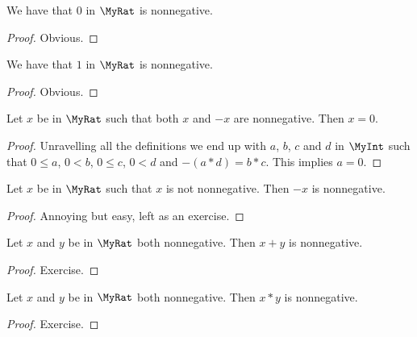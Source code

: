 \begin{lemma}
    \label{MyRat.zero_nonneg}
    \leanok
    We have that $0$ in $\MyRat$ is nonnegative.
\end{lemma}
\begin{proof}
    \leanok
    Obvious.
\end{proof}

\begin{lemma}
    \label{MyRat.one_nonneg}
    \leanok
    We have that $1$ in $\MyRat$ is nonnegative.
\end{lemma}
\begin{proof}
    \leanok
    Obvious.
\end{proof}

\begin{lemma}
    \label{MyRat.nonneg_neg}
    \leanok
    Let $x$ be in $\MyRat$ such that both $x$ and $-x$ are nonnegative. Then $x = 0$.
\end{lemma}
\begin{proof}
    \leanok
    Unravelling all the definitions we end up with $a$, $b$, $c$ and $d$ in $\MyInt$ such that $0 \leq a$, $0 < b$, $0 \leq c$, $0 < d$ and $-(a*d)=b*c$. This implies $a=0$.
\end{proof}

\begin{lemma}
    \label{MyRat.nonneg_neg_of_not_nonneg}
    \leanok
    Let $x$ be in $\MyRat$ such that $x$ is not nonnegative. Then $-x$ is nonnegative.
\end{lemma}
\begin{proof}
    \leanok
    Annoying but easy, left as an exercise.
\end{proof}

\begin{lemma}
    \label{MyRat.isNonneg_add_isNonneg}
    \leanok
    Let $x$ and $y$ be in $\MyRat$ both nonnegative. Then $x+y$ is nonnegative.
\end{lemma}
\begin{proof}
    \leanok
    Exercise.
\end{proof}

\begin{lemma}
    \label{MyRat.isNonneg_mul_isNonneg}
    \leanok
    Let $x$ and $y$ be in $\MyRat$ both nonnegative. Then $x*y$ is nonnegative.
\end{lemma}
\begin{proof}
    \leanok
    Exercise.
\end{proof}

